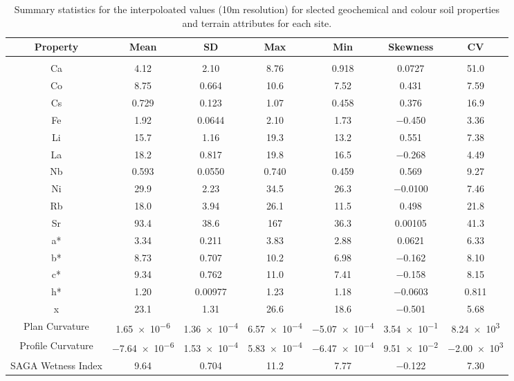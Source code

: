 \documentclass[
  number]{elsarticle}
\begin{document}
\begin{longtable}[]{@{}ccccccc@{}}

\caption{\label{tbl-univariate2-summary}Summary statistics for the
interpoloated values (10m resolution) for slected geochemical and colour
soil properties and terrain attributes for each site.}

\tabularnewline

\toprule\noalign{}
Property & Mean & SD & Max & Min & Skewness & CV \\
\midrule\noalign{}
\endhead
\bottomrule\noalign{}
\endlastfoot
\multicolumn{7}{@{}c@{}}{%
Agriculture} \\
Ca & 4.12 & 2.10 & 8.76 & 0.918 & 0.0727 & 51.0 \\
Co & 8.75 & 0.664 & 10.6 & 7.52 & 0.431 & 7.59 \\
Cs & 0.729 & 0.123 & 1.07 & 0.458 & 0.376 & 16.9 \\
Fe & 1.92 & 0.0644 & 2.10 & 1.73 & −0.450 & 3.36 \\
Li & 15.7 & 1.16 & 19.3 & 13.2 & 0.551 & 7.38 \\
La & 18.2 & 0.817 & 19.8 & 16.5 & −0.268 & 4.49 \\
Nb & 0.593 & 0.0550 & 0.740 & 0.459 & 0.569 & 9.27 \\
Ni & 29.9 & 2.23 & 34.5 & 26.3 & −0.0100 & 7.46 \\
Rb & 18.0 & 3.94 & 26.1 & 11.5 & 0.498 & 21.8 \\
Sr & 93.4 & 38.6 & 167 & 36.3 & 0.00105 & 41.3 \\
a* & 3.34 & 0.211 & 3.83 & 2.88 & 0.0621 & 6.33 \\
b* & 8.73 & 0.707 & 10.2 & 6.98 & −0.162 & 8.10 \\
c* & 9.34 & 0.762 & 11.0 & 7.41 & −0.158 & 8.15 \\
h* & 1.20 & 0.00977 & 1.23 & 1.18 & −0.0603 & 0.811 \\
x & 23.1 & 1.31 & 26.6 & 18.6 & −0.501 & 5.68 \\
Plan Curvature & 1.65~×~10\textsuperscript{−6} &
1.36~×~10\textsuperscript{−4} & 6.57~×~10\textsuperscript{−4} &
−5.07~×~10\textsuperscript{−4} & 3.54~×~10\textsuperscript{−1} &
8.24~×~10\textsuperscript{3} \\
Profile Curvature & −7.64~×~10\textsuperscript{−6} &
1.53~×~10\textsuperscript{−4} & 5.83~×~10\textsuperscript{−4} &
−6.47~×~10\textsuperscript{−4} & 9.51~×~10\textsuperscript{−2} &
−2.00~×~10\textsuperscript{3} \\
SAGA Wetness Index & 9.64 & 0.704 & 11.2 & 7.77 & −0.122 & 7.30 \\

\end{longtable}
\end{document}
